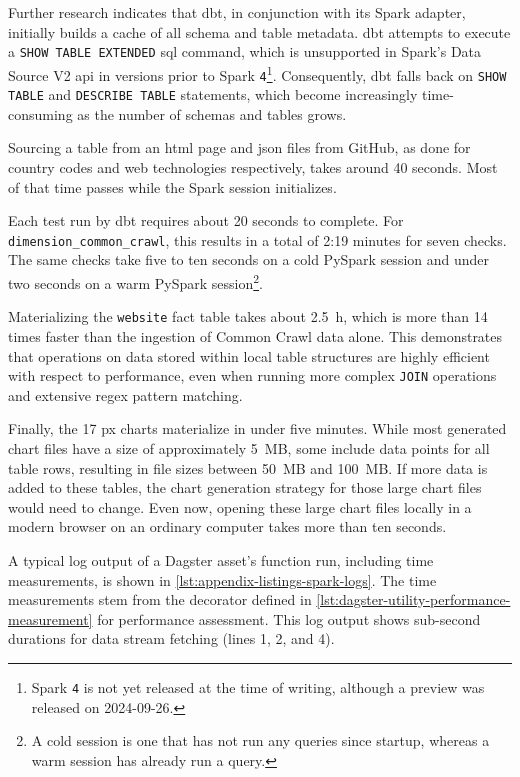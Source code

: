Further research indicates that dbt, in conjunction with its Spark adapter, initially builds a cache of all schema and table metadata.
dbt attempts to execute a \texttt{SHOW TABLE EXTENDED} \ac{sql} command, which is unsupported in Spark's Data Source V2 \ac{api} in versions prior to Spark \texttt{4}\footnote{Spark \texttt{4} is not yet released at the time of writing, although a preview was released on 2024-09-26.}.
Consequently, dbt falls back on \texttt{SHOW TABLE} and \texttt{DESCRIBE TABLE} statements, which become increasingly time-consuming as the number of schemas and tables grows.

Sourcing a table from an \ac{html} page and \ac{json} files from GitHub, as done for country codes and web technologies respectively, takes around 40 seconds.
Most of that time passes while the Spark session initializes.

Each test run by dbt requires about 20 seconds to complete.
For \texttt{dimension\_common\_crawl}, this results in a total of 2:19 minutes for seven checks.
The same checks take five to ten seconds on a cold PySpark session and under two seconds on a warm PySpark session\footnote{A cold session is one that has not run any queries since startup, whereas a warm session has already run a query.}.

Materializing the \texttt{website} fact table takes about 2.5~h, which is more than 14 times faster than the ingestion of Common Crawl data alone.
This demonstrates that operations on data stored within local table structures are highly efficient with respect to performance, even when running more complex \texttt{JOIN} operations and extensive \ac{regex} pattern matching.

Finally, the 17 \ac{px} charts materialize in under five minutes.
While most generated chart files have a size of approximately 5~MB, some include data points for all table rows, resulting in file sizes between 50~MB and 100~MB.
If more data is added to these tables, the chart generation strategy for those large chart files would need to change.
Even now, opening these large chart files locally in a modern browser on an ordinary computer takes more than ten seconds.

A typical log output of a Dagster asset's function run, including time measurements, is shown in \cref{lst:appendix-listings-spark-logs}.
The time measurements stem from the decorator defined in \cref{lst:dagster-utility-performance-measurement} for performance assessment.
This log output shows sub-second durations for data stream fetching (lines 1, 2, and 4).

